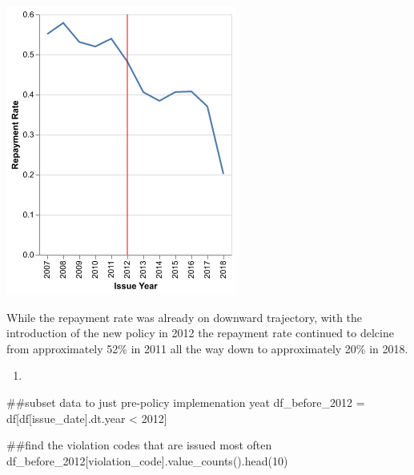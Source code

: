 \documentclass[
]{article}
\newenvironment{Shaded}{\begin{snugshade}}{\end{snugshade}}
\newcommand{\CommentTok}[1]{\textcolor[rgb]{0.37,0.37,0.37}{#1}}
\newcommand{\DecValTok}[1]{\textcolor[rgb]{0.68,0.00,0.00}{#1}}
\newcommand{\NormalTok}[1]{\textcolor[rgb]{0.00,0.23,0.31}{#1}}
\newcommand{\OperatorTok}[1]{\textcolor[rgb]{0.37,0.37,0.37}{#1}}
\newcommand{\StringTok}[1]{\textcolor[rgb]{0.13,0.47,0.30}{#1}}
\providecommand{\tightlist}{%
  \setlength{\itemsep}{0pt}\setlength{\parskip}{0pt}}\usepackage{longtable,booktabs,array}
\begin{document}
\includegraphics[width=2.97917in,height=3.75in]{pset2_template_files/figure-pdf/cell-21-output-1.png}

While the repayment rate was already on downward trajectory, with the
introduction of the new policy in 2012 the repayment rate continued to
delcine from approximately 52\% in 2011 all the way down to
approximately 20\% in 2018.

\begin{enumerate}
\def\labelenumi{\arabic{enumi}.}
\setcounter{enumi}{5}
\tightlist
\item
\end{enumerate}

\begin{Shaded}
\begin{Highlighting}[]
\CommentTok{\#\#subset data to just pre{-}policy implemenation yeat}
\NormalTok{df\_before\_2012 }\OperatorTok{=}\NormalTok{ df[df[}\StringTok{\textquotesingle{}issue\_date\textquotesingle{}}\NormalTok{].dt.year }\OperatorTok{\textless{}} \DecValTok{2012}\NormalTok{]}
\end{Highlighting}
\end{Shaded}

\begin{Shaded}
\begin{Highlighting}[]
\CommentTok{\#\#find the violation codes that are issued most often}
\NormalTok{df\_before\_2012[}\StringTok{\textquotesingle{}violation\_code\textquotesingle{}}\NormalTok{].value\_counts().head(}\DecValTok{10}\NormalTok{)}
\end{Highlighting}
\end{Shaded}
\end{document}
